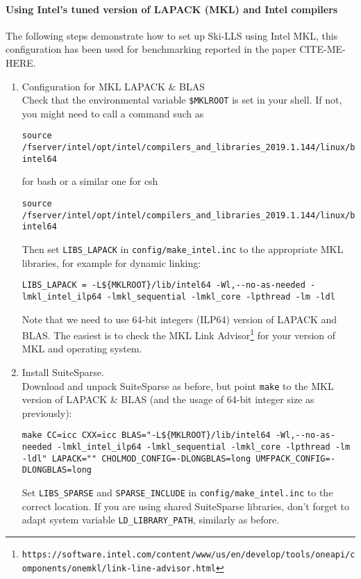 \documentclass[english,11pt]{article}
\begin{document}
\paragraph{Using Intel's tuned version of LAPACK (MKL) and Intel compilers}
The following steps demonstrate how to set up Ski-LLS using Intel MKL, this configuration has been used for benchmarking reported in the paper CITE-ME-HERE.
\begin{enumerate}
    \item Configuration for MKL LAPACK \& BLAS\\
    Check that the environmental variable {\tt \$MKLROOT} is set in your shell. If not, you might need to call a command such as  
    \begin{lstlisting}[breaklines=true, showstringspaces=false]
    source /fserver/intel/opt/intel/compilers_and_libraries_2019.1.144/linux/bin/compilervars.sh intel64
    \end{lstlisting}
    for bash or a similar one for csh
    \begin{lstlisting}[breaklines=true, showstringspaces=false]
    source /fserver/intel/opt/intel/compilers_and_libraries_2019.1.144/linux/bin/compilervars.csh intel64
    \end{lstlisting}
    Then set {\tt LIBS_LAPACK} in {\tt config/make_intel.inc} to the appropriate MKL libraries, for example for dynamic linking:
    \begin{lstlisting}[breaklines=true, showstringspaces=false]
    LIBS_LAPACK = -L${MKLROOT}/lib/intel64 -Wl,--no-as-needed -lmkl_intel_ilp64 -lmkl_sequential -lmkl_core -lpthread -lm -ldl
    \end{lstlisting}
    Note that we need to use 64-bit integers (ILP64) version of LAPACK and BLAS. The easiest is to check the MKL Link Advisor\footnote{\tt https://software.intel.com/content/www/us/en/develop/tools/oneapi/components/onemkl/link-line-advisor.html} for your version of MKL and operating system. 
    \item Install SuiteSparse.\\
    Download and unpack SuiteSparse as before, but point {\tt make} to the MKL version of LAPACK \& BLAS (and the usage of 64-bit integer size as previously):
    \begin{lstlisting}[breaklines=true, showstringspaces=false]
    make CC=icc CXX=icc BLAS="-L${MKLROOT}/lib/intel64 -Wl,--no-as-needed -lmkl_intel_ilp64 -lmkl_sequential -lmkl_core -lpthread -lm -ldl" LAPACK="" CHOLMOD_CONFIG=-DLONGBLAS=long UMFPACK_CONFIG=-DLONGBLAS=long
    \end{lstlisting}
    Set {\tt LIBS_SPARSE} and {\tt SPARSE_INCLUDE} in {\tt config/make_intel.inc} to the correct location. If you are using shared SuiteSparse libraries, don't forget to adapt system variable {\tt LD_LIBRARY_PATH}, similarly as before.


\end{enumerate}
\end{document}
